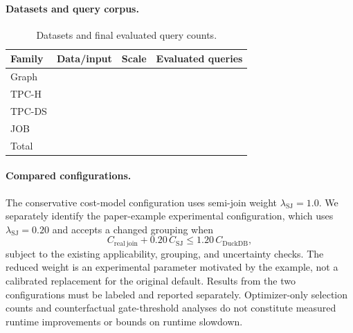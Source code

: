 \paragraph{Datasets and query corpus.}

\begin{table}[t]
  \centering
  \small
  \caption{Datasets and final evaluated query counts.}
  \label{tab:experimental-workload}
  \begin{tabular}{llll}
    \toprule
    Family & Data/input & Scale & Evaluated queries \\
    \midrule
    Graph & & & \\
    TPC-H & & & \\
    TPC-DS & & & \\
    JOB & & & \\
    \midrule
    Total & & & \\
    \bottomrule
  \end{tabular}
\end{table}

\paragraph{Compared configurations.}
The conservative cost-model configuration uses semi-join weight
$\lambda_{\mathrm{SJ}}=1.0$. We separately identify the paper-example
experimental configuration, which uses $\lambda_{\mathrm{SJ}}=0.20$ and
accepts a changed grouping when
\[
  C_{\mathrm{real\ join}} + 0.20\,C_{\mathrm{SJ}}
  \leq 1.20\,C_{\mathrm{DuckDB}},
\]
subject to the existing applicability, grouping, and uncertainty checks.
The reduced weight is an experimental parameter motivated by the example,
not a calibrated replacement for the original default. Results from the two
configurations must be labeled and reported separately. Optimizer-only
selection counts and counterfactual gate-threshold analyses do not constitute
measured runtime improvements or bounds on runtime slowdown.


